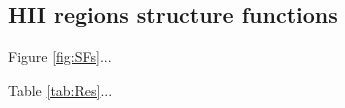 \documentclass[fleqn,usenatbib, useAMS, a4paper]{mnras}
\newcommand\halpha{H${\alpha}$}
\begin{document}
\subsection{HII regions structure functions}

Figure \ref{fig:SFs}...

Table \ref{tab:Res}...






  
\end{document}
